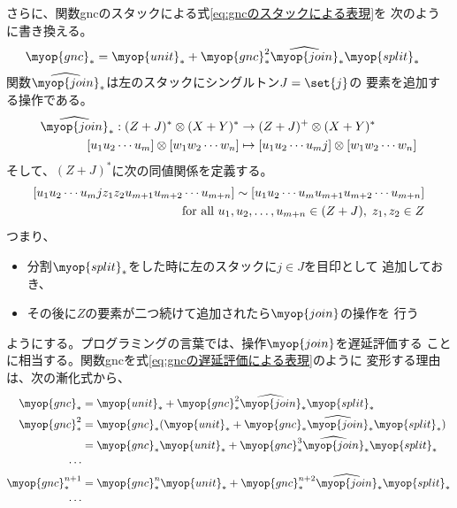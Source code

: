 	さらに、関数gncのスタックによる式\eqref{eq:gncのスタックによる表現}を
	次のように書き換える。
	\begin{equation}\label{eq:gncの遅延評価による表現}\begin{split} %
		\myop{gnc}_* &= \myop{unit}_*
		+ \myop{gnc}_*^2\widehat{\myop{join}}_*\myop{split}_*
	\end{split}\end{equation} %
	関数$\widehat{\myop{join}}_*$は左のスタックにシングルトン$J=\set{j}$の
	要素を追加する操作である。
	\begin{equation*}\begin{split} %
		\widehat{\myop{join}}_*: (Z+J)^*\otimes(X+Y)^* &\to (Z+J)^+\otimes(X+Y)^* \\
		\word{u_1u_2\cdots u_m}\otimes\word{w_1w_2\cdots w_n}
		&\mapsto \word{u_1u_2\cdots u_mj}\otimes\word{w_1w_2\cdots w_n} \\
	\end{split}\end{equation*} %
	そして、$(Z+J)^*$に次の同値関係を定義する。
	\begin{equation*}\begin{split} %
		\word{u_1u_2\cdots u_mjz_1z_2u_{m+1}u_{m+2}\cdots u_{m+n}}
		\sim \word{u_1u_2\cdots u_mu_{m+1}u_{m+2}\cdots u_{m+n}} \\
		\quad\text{for all }u_1,u_2,\dots,u_{m+n}\in (Z+J),\;z_1,z_2\in Z
	\end{split}\end{equation*} %
	つまり、
	\begin{itemize}\setlength{\itemsep}{-1mm} %
		\item 分割$\myop{split}_*$をした時に左のスタックに$j\in J$を目印として
		追加しておき、
		\item その後に$Z$の要素が二つ続けて追加されたら$\myop{join}$の操作を
		行う
	\end{itemize} %
	ようにする。プログラミングの言葉では、操作$\myop{join}$を遅延評価する
	ことに相当する。関数gncを式\eqref{eq:gncの遅延評価による表現}のように
	変形する理由は、次の漸化式から、
	\begin{equation*}\begin{split} %
		\myop{gnc}_* &= \myop{unit}_*
			+ \myop{gnc}_*^2\widehat{\myop{join}}_*\myop{split}_* \\
		\myop{gnc}_*^2 &= \myop{gnc}_*(\myop{unit}_*
			+ \myop{gnc}_*\widehat{\myop{join}}_*\myop{split}_*) \\
		&= \myop{gnc}_*\myop{unit}_*
			+ \myop{gnc}_*^3\widehat{\myop{join}}_*\myop{split}_* \\
		\cdots \\
		\myop{gnc}_*^{n+1} &= \myop{gnc}_*^n\myop{unit}_*
			+ \myop{gnc}_*^{n+2}\widehat{\myop{join}}_*\myop{split}_* \\
		\cdots \\
	\end{split}\end{equation*} %

